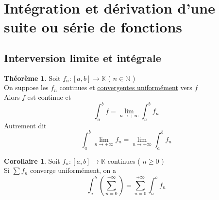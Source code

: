 \documentclass[10pt,a4paper]{article}
\theoremstyle{definition}
\newtheorem{theorem}[proposition]{Théorème}
\newtheorem{corollaire}[proposition]{Corollaire}
\begin{document}
\section{Intégration et dérivation d'une suite ou série de fonctions}
\subsection{Interversion limite et intégrale}
\begin{theorem}
    Soit $f_n: [a, b] \to \mathbb{K}$ ( $n \in \mathbb{N}$ ) \\
    On suppose les $f_n$ continues et \uline{convergentes uniformément} vers $f$ \\
    Alors $f$ est continue et \[\int_{a}^{b}f = \lim_{n \to +\infty} \int_{a}^{b}f_n\]
    Autrement dit \[\boxed{\int_{a}^{b}\lim_{n \to +\infty} f_n = \lim_{n \to +\infty} \int_{a}^{b} f_n}\]
\end{theorem}
\begin{corollaire}
    Soit $f_n: [a, b] \to \mathbb{K}$ continues ( $n \geq 0$ ) \\
    Si $\sum f_n$ converge uniformément, on a
    \[\boxed{\int_{a}^{b}\left(\sum_{n = 0}^{+\infty}\right) = \sum_{n = 0}^{+\infty} \int_{a}^{b} f_n}\]
\end{corollaire}
\end{document}

